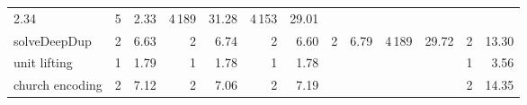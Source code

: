 \begin{tabular}{lrrrrrrrrrrrr}
 {\def\@currentlabel{2.34}\label{stats:RateDup:SharedThunk:time}2.34}&
 {\def\@currentlabel{5}\label{stats:RateDup:SharedEvaled:mem}5} &
 {\def\@currentlabel{2.33}\label{stats:RateDup:SharedEvaled:time}2.33}&
 {\def\@currentlabel{4\,189}\label{stats:RateDup:SharedFull:mem}4\,189} &
 {\def\@currentlabel{31.28}\label{stats:RateDup:SharedFull:time}31.28}&
 {\def\@currentlabel{4\,153}\label{stats:RateDup:RunTwice:mem}4\,153} &
 {\def\@currentlabel{29.01}\label{stats:RateDup:RunTwice:time}29.01} \\
\textsf{solveDeepDup}%
&
 {\def\@currentlabel{2}\label{stats:SolveDeepDup:Unshared:mem}2} &
 {\def\@currentlabel{6.63}\label{stats:SolveDeepDup:Unshared:time}6.63}&
 {\def\@currentlabel{2}\label{stats:SolveDeepDup:Shared:mem}2} &
 {\def\@currentlabel{6.74}\label{stats:SolveDeepDup:Shared:time}6.74}&
 {\def\@currentlabel{2}\label{stats:SolveDeepDup:SharedThunk:mem}2} &
 {\def\@currentlabel{6.60}\label{stats:SolveDeepDup:SharedThunk:time}6.60}&
 {\def\@currentlabel{2}\label{stats:SolveDeepDup:SharedEvaled:mem}2} &
 {\def\@currentlabel{6.79}\label{stats:SolveDeepDup:SharedEvaled:time}6.79}&
 {\def\@currentlabel{4\,189}\label{stats:SolveDeepDup:SharedFull:mem}4\,189} &
 {\def\@currentlabel{29.72}\label{stats:SolveDeepDup:SharedFull:time}29.72}&
 {\def\@currentlabel{2}\label{stats:SolveDeepDup:RunTwice:mem}2} &
 {\def\@currentlabel{13.30}\label{stats:SolveDeepDup:RunTwice:time}13.30} \\
unit lifting%
&
 {\def\@currentlabel{1}\label{stats:Unit:Unshared:mem}1} &
 {\def\@currentlabel{1.79}\label{stats:Unit:Unshared:time}1.79}&
 {\def\@currentlabel{1}\label{stats:Unit:Shared:mem}1} &
 {\def\@currentlabel{1.78}\label{stats:Unit:Shared:time}1.78}&
 {\def\@currentlabel{1}\label{stats:Unit:SharedThunk:mem}1} &
 {\def\@currentlabel{1.78}\label{stats:Unit:SharedThunk:time}1.78}&
&
&
&
&
 {\def\@currentlabel{1}\label{stats:Unit:RunTwice:mem}1} &
 {\def\@currentlabel{3.56}\label{stats:Unit:RunTwice:time}3.56} \\
church encoding%
&
 {\def\@currentlabel{2}\label{stats:Church:Unshared:mem}2} &
 {\def\@currentlabel{7.12}\label{stats:Church:Unshared:time}7.12}&
 {\def\@currentlabel{2}\label{stats:Church:Shared:mem}2} &
 {\def\@currentlabel{7.06}\label{stats:Church:Shared:time}7.06}&
 {\def\@currentlabel{2}\label{stats:Church:SharedThunk:mem}2} &
 {\def\@currentlabel{7.19}\label{stats:Church:SharedThunk:time}7.19}&
&
&
&
&
 {\def\@currentlabel{2}\label{stats:Church:RunTwice:mem}2} &
 {\def\@currentlabel{14.35}\label{stats:Church:RunTwice:time}14.35} \\
\end{tabular}
\makeatother
